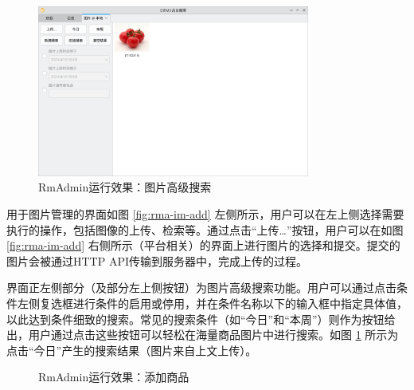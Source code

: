 \begin{figure}[htbp]
	\centering
	\includegraphics[width=0.8\textwidth]{./exp/rma-im-as.png}
	\caption{RmAdmin运行效果：图片高级搜索}
	\label{fig:rma-im-as}
\end{figure}

用于图片管理的界面如图 \ref{fig:rma-im-add} 左侧所示，用户可以在左上侧选择需要执行的操作，包括图像的上传、检索等。通过点击“上传\dots”按钮，用户可以在如图 \ref{fig:rma-im-add} 右侧所示（平台相关）的界面上进行图片的选择和提交。提交的图片会被通过HTTP API传输到服务器中，完成上传的过程。

界面正左侧部分（及部分左上侧按钮）为图片高级搜索功能。用户可以通过点击条件左侧复选框进行条件的启用或停用，并在条件名称以下的输入框中指定具体值，以此达到条件细致的搜索。常见的搜索条件（如“今日”和“本周”）则作为按钮给出，用户通过点击这些按钮可以轻松在海量商品图片中进行搜索。如图 \ref{fig:rma-im-as} 所示为点击“今日”产生的搜索结果（图片来自上文上传）。

\begin{figure}[htbp]
    \hfill
    \hfill
	\caption{RmAdmin运行效果：添加商品}
	\label{fig:rma-prod-add}
\end{figure}

